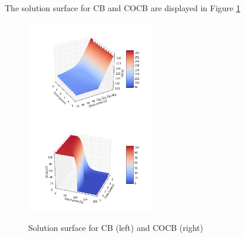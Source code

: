 \documentclass[12pt]{article}
\begin{document}
The solution surface for CB and COCB are displayed in Figure \ref{fig:surf}
\begin{figure}[h]
\includegraphics[width=0.5\textwidth]{Figures/CBsurf.png}
\includegraphics[width=0.5\textwidth]{Figures/COCBsurf.png}
\caption{Solution surface for CB (left) and COCB (right)}
\label{fig:surf}
\end{figure}
\end{document}

